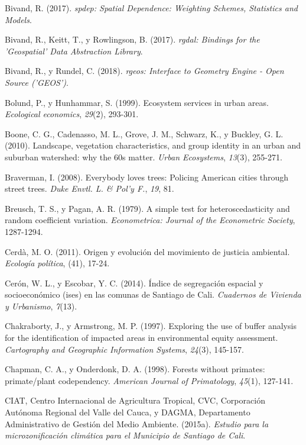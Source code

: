 \documentclass[12pt,a4paper,oneside, openany]{book}
\theoremstyle{definition}
\theoremstyle{definition}
\theoremstyle{definition}
\theoremstyle{remark}
\begin{document}
\hypertarget{ref-R-spdep}{}
Bivand, R. (2017). \emph{spdep: Spatial Dependence: Weighting Schemes,
Statistics and Models}.

\hypertarget{ref-R-rgdal}{}
Bivand, R., Keitt, T., y Rowlingson, B. (2017). \emph{rgdal: Bindings
for the 'Geospatial' Data Abstraction Library}.

\hypertarget{ref-R-rgeos}{}
Bivand, R., y Rundel, C. (2018). \emph{rgeos: Interface to Geometry
Engine - Open Source ('GEOS')}.

\hypertarget{ref-bolund_ecosystem_1999}{}
Bolund, P., y Hunhammar, S. (1999). Ecosystem services in urban areas.
\emph{Ecological economics}, \emph{29}(2), 293-301.

\hypertarget{ref-boone2010landscape}{}
Boone, C. G., Cadenasso, M. L., Grove, J. M., Schwarz, K., y Buckley, G.
L. (2010). Landscape, vegetation characteristics, and group identity in
an urban and suburban watershed: why the 60s matter. \emph{Urban
Ecosystems}, \emph{13}(3), 255-271.

\hypertarget{ref-braverman_everybody_2008}{}
Braverman, I. (2008). Everybody loves trees: Policing American cities
through street trees. \emph{Duke Envtl. L. \& Pol'y F.}, \emph{19}, 81.

\hypertarget{ref-breusch1979simple}{}
Breusch, T. S., y Pagan, A. R. (1979). A simple test for
heteroscedasticity and random coefficient variation. \emph{Econometrica:
Journal of the Econometric Society}, 1287-1294.

\hypertarget{ref-cerda_origen_2011}{}
Cerdà, M. O. (2011). Origen y evolución del movimiento de justicia
ambiental. \emph{Ecología política}, (41), 17-24.

\hypertarget{ref-ceron_indice_2014}{}
Cerón, W. L., y Escobar, Y. C. (2014). Índice de segregación espacial y
socioeconómico (ises) en las comunas de Santiago de Cali.
\emph{Cuadernos de Vivienda y Urbanismo}, \emph{7}(13).

\hypertarget{ref-chakraborty1997exploring}{}
Chakraborty, J., y Armstrong, M. P. (1997). Exploring the use of buffer
analysis for the identification of impacted areas in environmental
equity assessment. \emph{Cartography and Geographic Information
Systems}, \emph{24}(3), 145-157.

\hypertarget{ref-chapman_forests_1998}{}
Chapman, C. A., y Onderdonk, D. A. (1998). Forests without primates:
primate/plant codependency. \emph{American Journal of Primatology},
\emph{45}(1), 127-141.

\hypertarget{ref-ciat_microzona_2015}{}
CIAT, Centro Internacional de Agricultura Tropical, CVC, Corporación
Autónoma Regional del Valle del Cauca, y DAGMA, Departamento
Administrativo de Gestión del Medio Ambiente. (2015a). \emph{Estudio
para la microzonificación climática para el Municipio de Santiago de
Cali}.
\end{document}

